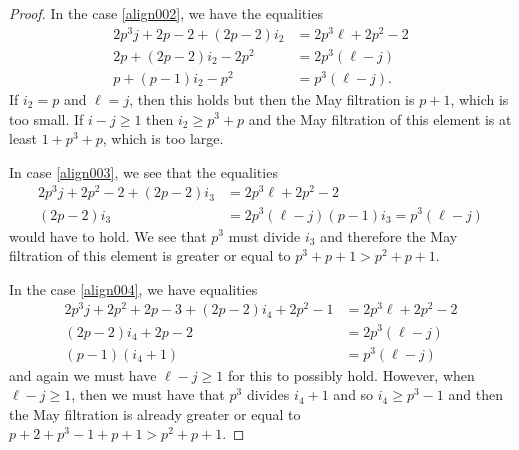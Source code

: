 \begin{proof}
 In the case \eqref{align002}, we have the equalities
  \begin{align*}
 2p^3j+2p-2+(2p-2)i_2 & = 2p^3\ell+2p^2-2\\
 2p+(2p-2)i_2-2p^2&=2p^3(\ell-j)\\
 p+(p-1)i_2-p^2&=p^3(\ell-j).
 \end{align*}
 If $i_2=p$ and $\ell=j$, then this holds but then the May filtration is $p+1$, which is too small. If $i-j\ge 1$ then $i_2\ge p^3+p$ and the May filtration of this element is at least $1+p^3+p$, which is too large. 
 
 In case \eqref{align003}, we see that the equalities
 \begin{align*}
 2 p^3j+2p^2-2 +(2p-2)i_3& =2p^3\ell+2p^2-2 \\
 (2p-2)i_3& =2p^3(\ell-j)
(p-1)i_3=p^3(\ell-j)
  \end{align*}
  would have to hold. We see that $p^3$ must divide $i_3$ and therefore the May filtration of this element is greater or equal to $p^3+p+1>p^2+p+1$. 
  
In the case \eqref{align004}, we have equalities
\begin{align*}
2p^3j+2p^2+2p-3+(2p-2)i_4+2p^2-1&=2p^3\ell+2p^2-2  \\
(2p-2)i_4+2p-2& = 2p^3(\ell-j) \\
(p-1)(i_4+1)& =p^3(\ell-j) 
\end{align*}
and again we must have $\ell-j\ge 1$ for this to possibly hold. However, when $\ell-j\ge 1$, then we must have that $p^3$ divides $i_4+1$ and so $i_4\ge p^3-1$ and then the May filtration is already greater or equal to $p+2+p^3-1+p+1> p^2+p+1$. 


\end{proof}

